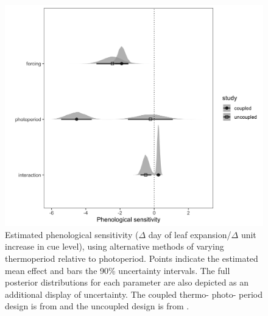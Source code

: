 \documentclass[11pt]{article}
\begin{document}
\begin{figure}[h!]
    \centering
 \includegraphics[width=.8\textwidth]{..//Plots/periodicity_figures/modelcomps_winter.jpeg}
    \caption{Estimated phenological sensitivity ($\Delta$ day of leaf expansion/$\Delta$ unit increase in cue level), using alternative methods of varying thermoperiod relative to photoperiod. Points indicate the estimated mean effect and bars the 90\% uncertainty intervals. The full posterior distributions for each parameter are also depicted as an additional display of uncertainty. The coupled thermo- photo- period design is from \citet{Flynn2018} and the uncoupled design is from \cite{Buonaiuto:2021ug}.}
    \label{fig:compy}
\end{figure}

 
\end{document}
